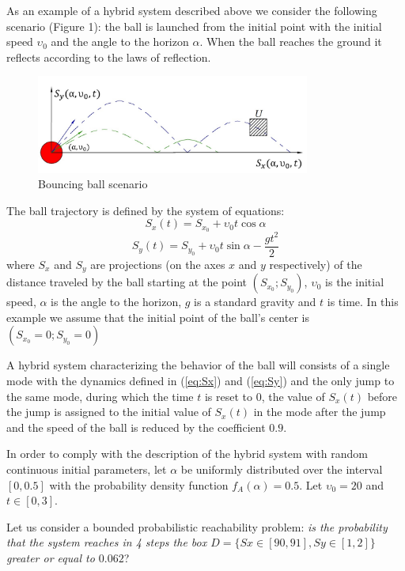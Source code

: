 As an example of a hybrid system described above we consider the following scenario (Figure 1): 
the ball is launched from the initial point with the initial speed $\upsilon_0$ and the angle 
to the horizon $\alpha$. When the ball reaches the ground it reflects according to the laws 
of reflection.

\begin{figure}[ht!]
\centering
\includegraphics[width=90mm]{bouncing-ball.jpg}
\caption{Bouncing ball scenario}
\end{figure}

The ball trajectory is defined by the system of equations:
\begin{equation} \label{eq:Sx}
S_x(t) = S_{x_0} + \upsilon_0 t \cos{\alpha}
\end{equation}
\begin{equation} \label{eq:Sy}
S_y(t) = S_{y_0} + \upsilon_0 t \sin{\alpha} - \frac{g t^2}{2}
\end{equation}
where $S_x$ and $S_y$ are projections (on the axes $x$ and $y$ respectively) of the distance traveled by the ball starting at the point $(S_{x_0}; S_{y_0})$, $\upsilon_0$ is the initial speed, $\alpha$ is the angle to the horizon, $g$ is a standard gravity and $t$ is time. In this example we assume that the initial point of the ball's center is $(S_{x_0} = 0; S_{y_0} = 0)$

A hybrid system characterizing the behavior of the ball will consists of a single mode with the dynamics defined in (\ref{eq:Sx}) and (\ref{eq:Sy}) and the only jump to the same mode, during which the time $t$ is reset to $0$, the value of $S_x(t)$ before the jump is assigned to the initial value of $S_x(t)$ in the mode after the jump and the speed of the ball is reduced by the coefficient $0.9$.

In order to comply with the description of the hybrid system with random continuous initial parameters, let $\alpha$ be uniformly distributed over the interval $[0, 0.5]$ with the probability density function $f_{A}(\alpha) = 0.5$. Let $\upsilon_0 = 20$ and $t \in [0, 3]$.

Let us consider a bounded probabilistic reachability problem: \textit{is the probability that 
the system reaches in 4 steps the box $D =  \{Sx \in [90, 91], Sy \in [1, 2]\}$ greater or equal 
to $0.062$}?

